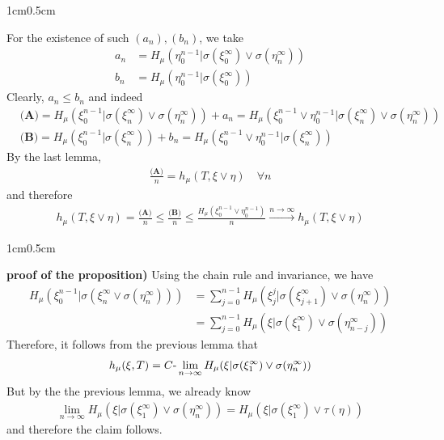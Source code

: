 \documentclass[12pt,a4paper]{report}
\newenvironment{proof}
{\begin{changemargin}{1cm}{0.5cm} 
	}%
	{\end{changemargin}
}
\begin{document}
\begin{proof}
For the existence of such $(a_n),(b_n)$, we take
\begin{align*}
a_n &= H_{\mu} (\eta_0^{n-1} | \sigma(\xi_0^{\infty}) \vee \sigma(\eta_n^{\infty})) \\
b_n &= H_{\mu} (\eta_0^{n-1} | \sigma(\xi_0^{\infty}) )
\end{align*}
Clearly, $a_n \leq b_n$ and indeed
\begin{align*}
& \textbf{(A)} = H_{\mu}(\xi_0^{n-1} | \sigma(\xi_n^{\infty}) \vee \sigma(\eta_n^{\infty})) + a_n = H_{\mu}(\xi_0^{n-1} \vee \eta_0^{n-1} | \sigma (\xi_n^{\infty}) \vee \sigma(\eta_n^{\infty})) \\
& \textbf{(B)} = H_{\mu}(\xi_0^{n-1} | \sigma(\xi_n^{\infty})) + b_n = H_{\mu}(\xi_0^{n-1} \vee \eta_0^{n-1} | \sigma (\xi_n^{\infty}))
\end{align*}
By the last lemma,
\begin{align*}
\frac{\textbf{(A)}}{n} = h_{\mu}(T, \xi \vee \eta) \quad \forall n
\end{align*}
and therefore
\begin{align*}
h_{\mu}(T, \xi\vee \eta) = \frac{\textbf{(A)}}{n} \leq \frac{\textbf{(B)}}{n} \leq \frac{H_{\mu}(\xi_0^{n-1} \vee \eta_{0}^{n-1})}{n} \xrightarrow{n\rightarrow \infty} h_{\mu}(T, \xi\vee \eta)
\end{align*}

\eop
\end{proof}
\s

\begin{proof}
\textbf{proof of the proposition)} Using the chain rule and invariance, we have
\begin{align*}
H_{\mu}(\xi_0^{n-1} | \sigma(\xi_n^{\infty} \vee \sigma(\eta_n^{\infty}))) &= \sum_{j=0}^{n-1} H_{\mu}(\xi_j^j | \sigma(\xi_{j+1}^{\infty}) \vee \sigma(\eta_{n}^{\infty})) \\
&= \sum_{j=0}^{n-1} H_{\mu}(\xi | \sigma(\xi_1^{\infty}) \vee \sigma(\eta_{n-j}^{\infty}))
\end{align*}
Therefore, it follows from the previous lemma that
\begin{align*}
h_{\mu}(\xi, T) = C\text{-}\lim_{n\rightarrow \infty} H_{\mu}(\xi | \sigma(\xi_1^{\infty}) \vee \sigma(\eta_n^{\infty}))
\end{align*}
But by the the previous lemma, we already know
\begin{align*}
\lim_{n\rightarrow \infty} H_{\mu}(\xi | \sigma(\xi_1^{\infty})\vee \sigma(\eta_n^{\infty})) = H_{\mu}(\xi | \sigma(\xi_1^{\infty})\vee \tau(\eta))
\end{align*}
and therefore the claim follows.

\eop
\end{proof}
\end{document}
